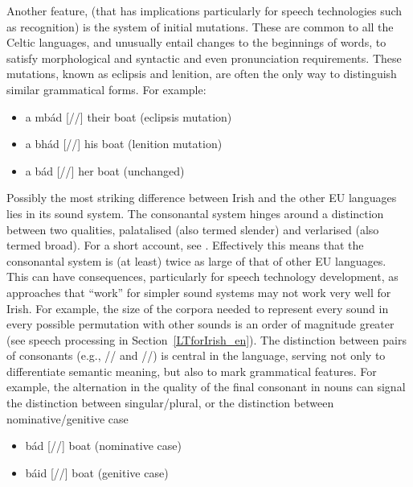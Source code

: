 \begin{multicols}{2}
Another feature, (that has implications particularly for speech technologies such as recognition) is the system of  initial mutations. These are common to all the Celtic languages, and unusually entail changes to the beginnings of words, to satisfy morphological and syntactic and even pronunciation requirements. These mutations, known as eclipsis and lenition, are often the only way to distinguish similar grammatical forms. For example:

\begin{itemize}
\item a mbád [//] their boat (eclipsis mutation)
\item a bhád [//] his boat (lenition mutation)
\item a bád [//] her boat (unchanged)
\end{itemize}

Possibly the most striking difference between Irish and the other EU languages lies in its sound system. The consonantal system hinges around a distinction between two qualities, palatalised (also termed slender) and verlarised (also termed broad). For a short account, see \cite{ipaguide}. Effectively this means that the consonantal system is (at least) twice as large of that of other EU languages.  This can have consequences, particularly for speech technology development, as approaches that ``work'' for simpler sound systems may not work very well for Irish. For example, the size of the corpora needed to represent every sound in every possible permutation with other sounds is an order of magnitude greater (see speech processing in Section~\ref{LTforIrish_en}). The distinction between pairs of consonants (e.g., // and //) is central in the language, serving not only to differentiate semantic meaning, but also to mark grammatical features. For example, the alternation in the quality of the final consonant in nouns can signal the distinction between singular/plural, or the distinction between nominative/genitive case


\begin{itemize}
\item bád    [//]  boat  (nominative case)
\item báid   [//]  boat  (genitive case)
\end{itemize}


\end{multicols}
